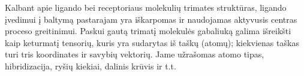 Kalbant apie ligando bei receptoriaus molekulių trimates struktūras, ligando įvedimui į baltymą pastarajam yra iškarpomas ir naudojamas aktyvusis centras proceso greitinimui. Paskui gautą trimatį molekulės gabaliuką galima išreikšti kaip keturmatį tensorių, kuris yra sudarytas iš taškų (atomų); kiekvienas taškas turi tris koordinates ir savybių vektorių. Jame užrašomas atomo tipas, hibridizacija, ryšių kiekiai, dalinis krūvis ir t.t.\cite{stepniewska-dziubinska_development_2018}





